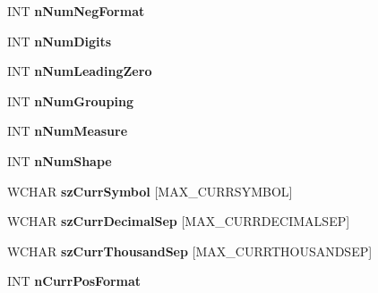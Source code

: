 \begin{DoxyCompactItemize}
I\+NT {\bfseries n\+Num\+Neg\+Format}
\item 
\mbox{\label{struct___g_l_o_b_a_l_d_a_t_a_a660bf04dbbc9f967c20d5ded57d23a9d}} 
I\+NT {\bfseries n\+Num\+Digits}
\item 
\mbox{\label{struct___g_l_o_b_a_l_d_a_t_a_aafdec3eea379e4059f8326f4d38bdbdb}} 
I\+NT {\bfseries n\+Num\+Leading\+Zero}
\item 
\mbox{\label{struct___g_l_o_b_a_l_d_a_t_a_a2fb13f48e3b6e331ac3e40adc4f5d13f}} 
I\+NT {\bfseries n\+Num\+Grouping}
\item 
\mbox{\label{struct___g_l_o_b_a_l_d_a_t_a_aeaf648089d68284af0c89308ddad462c}} 
I\+NT {\bfseries n\+Num\+Measure}
\item 
\mbox{\label{struct___g_l_o_b_a_l_d_a_t_a_af6625eb7ba5ed6822124003856131f6b}} 
I\+NT {\bfseries n\+Num\+Shape}
\item 
\mbox{\label{struct___g_l_o_b_a_l_d_a_t_a_a8171b657070aed8f882f99b1cd5b77ce}} 
W\+C\+H\+AR {\bfseries sz\+Curr\+Symbol} \mbox{[}M\+A\+X\+\_\+\+C\+U\+R\+R\+S\+Y\+M\+B\+OL\mbox{]}
\item 
\mbox{\label{struct___g_l_o_b_a_l_d_a_t_a_a4b89c992feecdb06426992175d7ed9f9}} 
W\+C\+H\+AR {\bfseries sz\+Curr\+Decimal\+Sep} \mbox{[}M\+A\+X\+\_\+\+C\+U\+R\+R\+D\+E\+C\+I\+M\+A\+L\+S\+EP\mbox{]}
\item 
\mbox{\label{struct___g_l_o_b_a_l_d_a_t_a_a0e70af09cab1775d25933945ad9c5ff9}} 
W\+C\+H\+AR {\bfseries sz\+Curr\+Thousand\+Sep} \mbox{[}M\+A\+X\+\_\+\+C\+U\+R\+R\+T\+H\+O\+U\+S\+A\+N\+D\+S\+EP\mbox{]}
\item 
\mbox{\label{struct___g_l_o_b_a_l_d_a_t_a_a795a7454d705d34261b5682a6e6af963}} 
I\+NT {\bfseries n\+Curr\+Pos\+Format}
\item 
\mbox{\label{struct___g_l_o_b_a_l_d_a_t_a_aa756d45295be6722a73d02407d22826e}} 

\end{DoxyCompactItemize}
